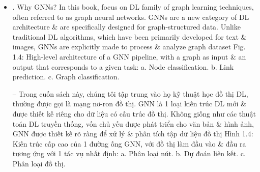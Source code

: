 \documentclass{article}
\begin{document}
\begin{itemize}
\begin{itemize}
        {\sf Fig. 1.3: Family tree as a tabular dataset vs. a graph dataset}: this dataset represents information about 5 members of a family. Each member has 3 features (or attributes): name, age, \& gender. However, tabular version of this dataset does not show connections between these people. On contrary, graph version represents them with edges, which allows us to understand relationships in this family. In many contexts, connections between nodes are crucial in understanding data, which is why representing data in graph form is becoming increasingly popular.

        -- {\sf Hình 1.3: Cây phả hệ dưới dạng tập dữ liệu bảng so với tập dữ liệu đồ thị}: tập dữ liệu này biểu diễn thông tin về 5 thành viên trong 1 gia đình. Mỗi thành viên có 3 đặc điểm (hoặc thuộc tính): tên, tuổi, \& giới tính. Tuy nhiên, phiên bản bảng của tập dữ liệu này không thể hiện mối liên hệ giữa những người này. Ngược lại, phiên bản đồ thị biểu diễn họ bằng các cạnh, cho phép chúng ta hiểu các mối quan hệ trong gia đình này. Trong nhiều bối cảnh, mối liên hệ giữa các nút rất quan trọng để hiểu dữ liệu, đó là lý do tại sao việc biểu diễn dữ liệu dưới dạng đồ thị ngày càng trở nên phổ biến.

        Now have a basic understanding of graph ML \& different types of tasks it involves, can move on to exploring 1 of most important approaches for solving these tasks: GNNs.
        \item {. Why GNNs?} In this book, focus on DL family of graph learning techniques, often referred to as graph neural networks. GNNs are a new category of DL architecture \& are specifically designed for graph-structured data. Unlike traditional DL algorithms, which have been primarily developed for text \& images, GNNs are explicitly made to process \& analyze graph dataset {\sf Fig. 1.4: High-level architecture of a GNN pipeline, with a graph as input \& an output that corresponds to a given task: a. Node classification. b. Link prediction. c. Graph classification.}

        -- Trong cuốn sách này, chúng tôi tập trung vào họ kỹ thuật học đồ thị DL, thường được gọi là mạng nơ-ron đồ thị. GNN là 1 loại kiến trúc DL mới \& được thiết kế riêng cho dữ liệu có cấu trúc đồ thị. Không giống như các thuật toán DL truyền thống, vốn chủ yếu được phát triển cho văn bản \& hình ảnh, GNN được thiết kế rõ ràng để xử lý \& phân tích tập dữ liệu đồ thị {\sf Hình 1.4: Kiến trúc cấp cao của 1 đường ống GNN, với đồ thị làm đầu vào \& đầu ra tương ứng với 1 tác vụ nhất định: a. Phân loại nút. b. Dự đoán liên kết. c. Phân loại đồ thị.}


\end{itemize}
\end{itemize}
\end{document}
